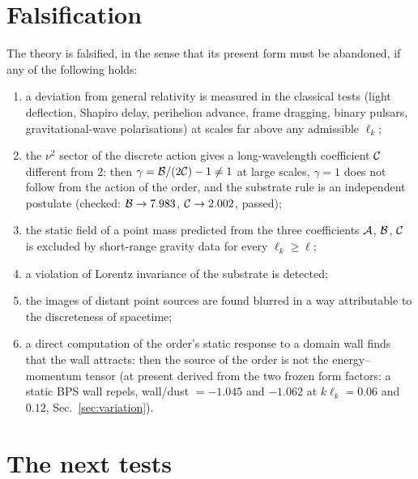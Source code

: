 \section{Falsification}\label{sec:falsification}

The theory is falsified, in the sense that its present form must be abandoned, if any of the following
holds:
\begin{enumerate}
\item a deviation from general relativity is measured in the classical tests (light deflection,
  Shapiro delay, perihelion advance, frame dragging, binary pulsars, gravitational-wave polarisations)
  at scales far above any admissible $\ell_k$;
\item the $\nu^2$ sector of the discrete action gives a long-wavelength coefficient $\mathcal{C}$ different from
  $2$: then $\gamma=\mathcal{B}/(2\mathcal{C})-1\neq1$ at large scales, $\gamma=1$ does not follow from the action of the order,
  and the substrate rule is an independent postulate (checked: $\mathcal{B}\to7.983$, $\mathcal{C}\to2.002$, passed);
\item the static field of a point mass predicted from the three coefficients $\mathcal{A}$, $\mathcal{B}$, $\mathcal{C}$ is excluded by
  short-range gravity data for every $\ell_k\ge\ell$;
\item a violation of Lorentz invariance of the substrate is detected;
\item the images of distant point sources are found blurred in a way attributable to the discreteness
  of spacetime;
\item a direct computation of the order's static response to a domain wall finds that the wall attracts: then the
  source of the order is not the energy--momentum tensor (at present derived from the two frozen form factors: a
  static BPS wall repels, wall/dust $=-1.045$ and $-1.062$ at $k\ell_k=0.06$ and $0.12$, Sec.~\ref{sec:variation}).
\end{enumerate}

\section{The next tests}\label{sec:next-tests}

